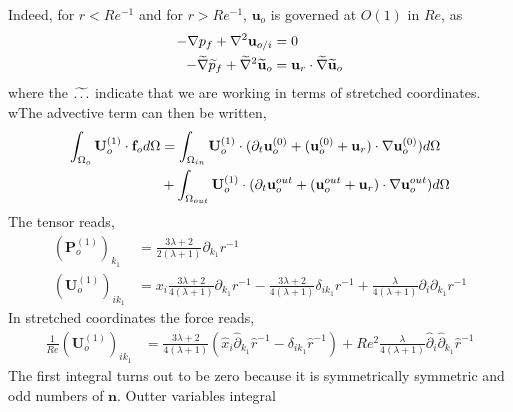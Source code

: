 Indeed, for $r < Re^{-1}$ and for $r > Re^{-1}$, $\textbf{u}_o$ is governed at $O(1)$ in $Re$,  as
\begin{align*}
    - \grad p_f
    + \grad^2 \textbf{u}_{o/i}
    &= 0 \\
    - \wt{\grad} \wt{p}_f
    + \wt{\grad}^2 \wt{\textbf{u}}_{o}
    &= \textbf{u}_r\cdot \wt{\grad} \wt{\textbf{u}}_{o}
\end{align*}
where the $\wt{\ldots}$ indicate that we are working in terms of stretched coordinates.
wThe advective term can then be written,
\begin{align}
    \intO[o]{\textbf{U}_{o}^{(1)}\cdot \textbf{f}_{o}}
    &=
    \intO[in]{\textbf{U}_{o}^{(1)}\cdot (\pddt \textbf{u}_{o}^{(0)}
    + (\textbf{u}_{o}^{(0)}+\textbf{u}_r)\cdot \grad \textbf{u}_{o}^{(0)})}\\
    &+\intO[out]{\textbf{U}_{o}^{(1)}\cdot (\pddt \textbf{u}_{o}^{out}
    + (\textbf{u}_{o}^{out}+\textbf{u}_r)\cdot \grad \textbf{u}_{o}^{out})}
\end{align}
The tensor reads,
\begin{align*}
    (\textbf{P}_o^{(1)})_{k_1}
    &=
    \frac{3\lambda +2}{2(\lambda+1)}\partial_{k_1}r^{-1}\\
    (\textbf{U}_o^{(1)})_{i k_1}
    &=
    x_i \frac{3\lambda +2}{4(\lambda+1)}\partial_{k_1}r^{-1}
    - \frac{3\lambda +2}{4(\lambda+1)}\delta_{ik_1}r^{-1}
    +\frac{\lambda}{4(\lambda+1)} \partial_i \partial_{k_1} r^{-1}
\end{align*}
In stretched coordinates the force reads,
\begin{align*}
    \frac{1}{Re}(\textbf{U}_o^{(1)})_{i k_1}
    &=
     \frac{3\lambda +2}{4(\lambda+1)} (\hat{x}_i\hat{\partial}_{k_1}\hat{r}^{-1}
    - \delta_{ik_1}\hat{r}^{-1})
    + Re^2\frac{\lambda}{4(\lambda+1)} \hat{\partial}_i \hat{\partial}_{k_1} \hat{r}^{-1}
\end{align*}
The first integral turns out to be zero because it is symmetrically symmetric and odd numbers of $\textbf{n}$.
Outter variables integral
